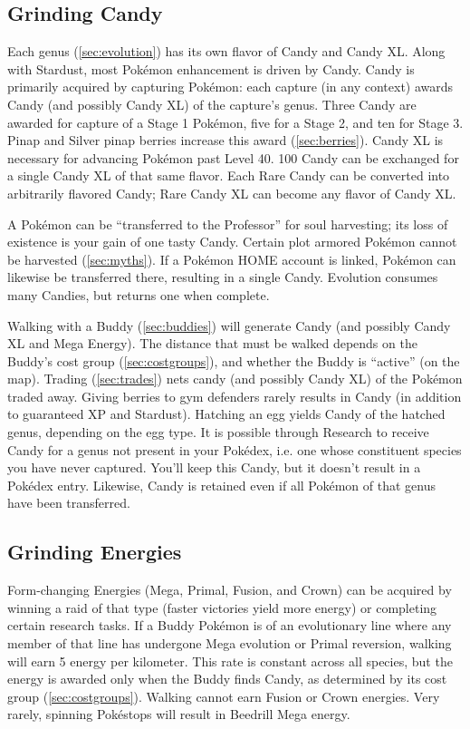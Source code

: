 \subsection{Grinding Candy}
\label{subsec:getcandy}
Each genus (\autoref{sec:evolution}) has its own flavor of Candy and Candy XL.
Along with Stardust, most Pokémon enhancement is driven by Candy.
Candy is primarily acquired by capturing Pokémon: each capture (in any context)
  awards Candy (and possibly Candy XL) of the capture's genus.
Three Candy are awarded for capture of a Stage 1 Pokémon, five for a Stage 2,
  and ten for Stage 3.
Pinap and Silver pinap berries increase this award (\autoref{sec:berries}).
Candy XL is necessary for advancing Pokémon past Level 40.
100 Candy can be exchanged for a single Candy XL of that same flavor.
Each Rare Candy can be converted into arbitrarily flavored Candy; Rare Candy XL can become any flavor of Candy XL\@.

A Pokémon can be ``transferred to the Professor'' for soul harvesting;
  its loss of existence is your gain of one tasty Candy.
Certain plot armored Pokémon cannot be harvested (\autoref{sec:myths}).
If a Pokémon HOME account is linked, Pokémon can likewise be transferred there,
  resulting in a single Candy.
Evolution consumes many Candies, but returns one when complete.

Walking with a Buddy (\autoref{sec:buddies}) will generate Candy (and possibly Candy XL and Mega Energy).
The distance that must be walked depends on the Buddy's cost group (\autoref{sec:costgroups}),
 and whether the Buddy is ``active'' (on the map).
Trading (\autoref{sec:trades}) nets candy (and possibly Candy XL) of the Pokémon traded away.
Giving berries to gym defenders rarely results in Candy (in addition to guaranteed XP and Stardust).
Hatching an egg yields Candy of the hatched genus, depending on the egg type.
It is possible through Research to receive Candy for a genus not present in
  your Pokédex, i.e. one whose constituent species you have never captured.
You'll keep this Candy, but it doesn't result in a Pokédex entry.
Likewise, Candy is retained even if all Pokémon of that genus have been transferred.
\subsection{Grinding Energies}
Form-changing Energies (Mega, Primal, Fusion, and Crown) can be acquired by winning a raid of that type
  (faster victories yield more energy) or completing certain research tasks.
If a Buddy Pokémon is of an evolutionary line where any member of that line has undergone Mega evolution
  or Primal reversion, walking will earn 5 energy per kilometer.
This rate is constant across all species, but the energy is awarded only when the Buddy finds Candy,
  as determined by its cost group (\autoref{sec:costgroups}).
Walking cannot earn Fusion or Crown energies.
Very rarely, spinning Pokéstops will result in Beedrill Mega energy.

